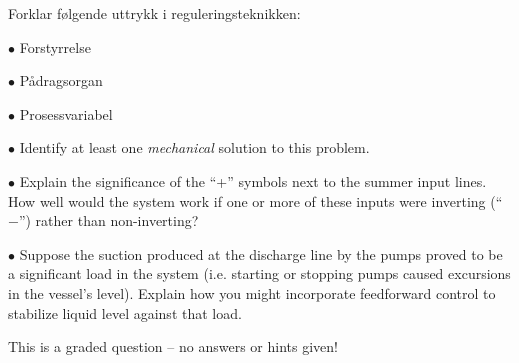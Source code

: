 

Forklar følgende uttrykk i reguleringsteknikken:

\medskip
\item{$\bullet$} Forstyrrelse 
\item{$\bullet$} P{\aa}dragsorgan
\item{$\bullet$} Prosessvariabel
\medskip

\medskip
\item{$\bullet$} Identify at least one {\it mechanical} solution to this problem.
\item{$\bullet$} Explain the significance of the ``+'' symbols next to the summer input lines.  How well would the system work if one or more of these inputs were inverting (``$-$'') rather than non-inverting?
\item{$\bullet$} Suppose the suction produced at the discharge line by the pumps proved to be a significant load in the system (i.e. starting or stopping pumps caused excursions in the vessel's level).  Explain how you might incorporate feedforward control to stabilize liquid level against that load.
\medskip

\eject






This is a graded question -- no answers or hints given!









